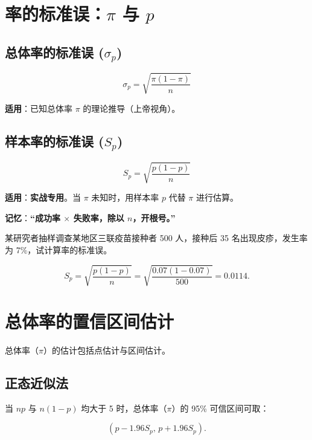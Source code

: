 \documentclass[lang=cn,10pt]{elegantbook}
\begin{document}
\section{率的标准误：$\pi$ 与 $p$ }

\subsection{总体率的标准误 ($\sigma_p$)}
    \[ \sigma_p = \sqrt{\frac{\pi(1-\pi)}{n}} \]
    
    \textbf{适用}：已知总体率 $\pi$ 的理论推导（上帝视角）。

\subsection{样本率的标准误 ($S_p$)}
    \[ S_p = \sqrt{\frac{p(1-p)}{n}} \]
   
    \textbf{适用}：\textbf{实战专用}。当 $\pi$ 未知时，用样本率 $p$ 代替 $\pi$ 进行估算。
    
    \textbf{记忆}：\textbf{“成功率 $\times$ 失败率，除以 $n$，开根号。”}


\vspace{0.2cm}
\begin{exercise}
    某研究者抽样调查某地区三联疫苗接种者 500 人，接种后 35 名出现皮疹，发生率为 7\%，试计算率的标准误。
\end{exercise}

\vspace{0.2cm}
\begin{solution}
\[
  S_p=\sqrt{\frac{p(1-p)}{n}}=\sqrt{\frac{0.07(1-0.07)}{500}}=0.0114.
\] 
\end{solution}

\section{总体率的置信区间估计}

总体率（$\pi$）的估计包括点估计与区间估计。

\subsection{正态近似法}

当 $np$ 与 $n(1-p)$ 均大于 5 时，总体率（$\pi$）的 95\% 可信区间可取：

\begin{equation}
  \left(p-1.96S_p,\,p+1.96S_p\right).
\end{equation}
\end{document}
